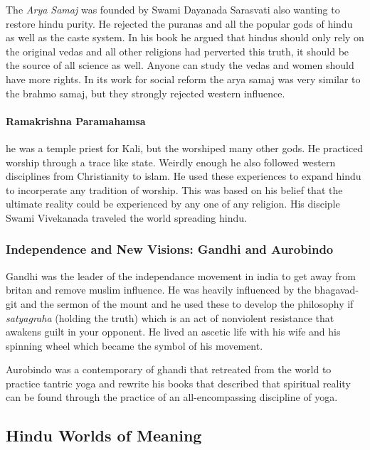 \documentclass{article}
\begin{document}
The \emph{Arya Samaj} was founded by Swami Dayanada Sarasvati also wanting to restore hindu purity. He rejected the puranas and all the popular gods of hindu as well as the caste system. In his book he argued that hindus should only rely on the original vedas and all other religions had perverted this truth, it should be the source of all science as well. Anyone can study the vedas and women should have more rights. In its work for social reform the arya samaj was very similar to the brahmo samaj, but they strongly rejected western influence.

\paragraph{Ramakrishna Paramahamsa}
\label{par:ramakrishna_paramahamsa}
he was a temple priest for Kali, but the worshiped many other gods. He practiced worship through a trace like state. Weirdly enough he also followed western disciplines from Christianity to islam. He used these experiences to expand hindu to incorperate any tradition of worship. This was based on his belief that the ultimate reality could be experienced by any one of any religion. His disciple Swami Vivekanada traveled the world spreading hindu.

\subsubsection{Independence and New Visions: Gandhi and Aurobindo}
\label{ssub:independence_and_new_visions_gandhi_and_aurobindo}
Gandhi was the leader of the independance movement in india to get away from britan and remove muslim influence. He was heavily influenced by the bhagavad-git and the sermon of the mount and he used these to develop the philosophy if \emph{satyagraha} (holding the truth) which is an act of nonviolent resistance that awakens guilt in your opponent. He lived an ascetic life with his wife and his spinning wheel which became the symbol of his movement.

Aurobindo was a contemporary of ghandi that retreated from the world to practice tantric yoga and rewrite his books that described that spiritual reality can be found through the practice of an all-encompassing discipline of yoga.

\subsection{Hindu Worlds of Meaning}
\label{sec:hindu_worlds_of_meaning}
\end{document}
